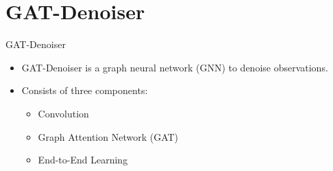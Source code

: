 
\section{GAT-Denoiser}

\begin{frame}{GAT-Denoiser}
  \begin{itemize}
    \item GAT-Denoiser is a graph neural network (GNN) to denoise observations.
    \item Consists of three components:
    \begin{itemize}
      \item Convolution
      \item Graph Attention Network (GAT) \cite{GAT}
      \item End-to-End Learning
    \end{itemize}
  \end{itemize}




\end{frame}

